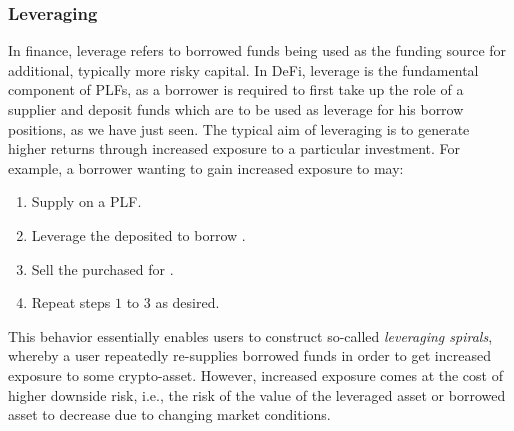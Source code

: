 \subsubsection{Leveraging}
In finance, leverage refers to borrowed funds being used as the funding source for additional, typically more risky capital.
In DeFi, leverage is the fundamental component of PLFs, as a borrower is required to first take up the role of a supplier and deposit funds which are to be used as leverage for his borrow positions, as we have just seen.
The typical aim of leveraging is to generate higher returns through increased exposure to a particular investment.
For example, a borrower wanting to gain increased exposure to  may:
\begin{enumerate}
\item Supply  on a PLF.
\item Leverage the deposited  to borrow .
\item Sell the purchased  for .
\item Repeat steps $1$ to $3$ as desired. 
\end{enumerate}

This behavior essentially enables users to construct so-called \textit{leveraging spirals}, whereby a user repeatedly re-supplies borrowed funds in order to get increased exposure to some crypto-asset. 
However, increased exposure comes at the cost of higher downside risk, i.e., the risk of the value of the leveraged asset or borrowed asset to decrease due to changing market conditions.

